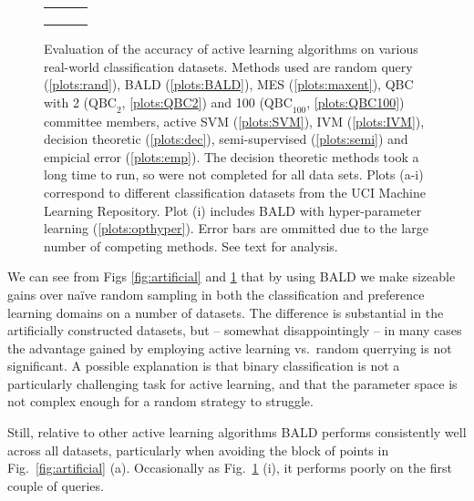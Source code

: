 \begin{figure}
	\begin{center}
	\begin{tabular}{ccc}
	&
	&
	\\
	&
	&
	\\
	&
	&
	
	\end{tabular}
	\end{center}
	\caption[Evaluation of Bayesian active learning on real-world data sets]{Evaluation of the accuracy of active learning algorithms on various real-world classification datasets. Methods used are random query (\ref{plots:rand}), BALD (\ref{plots:BALD}),  MES (\ref{plots:maxent}), QBC with 2 ($\mbox{QBC}_2$, \ref{plots:QBC2}) and 100 ($\mbox{QBC}_{100}$, \ref{plots:QBC100}) committee members, active SVM (\ref{plots:SVM}), IVM (\ref{plots:IVM}), decision theoretic \citep{Kapoor2007} (\ref{plots:dec}), semi-supervised \citep{Zhu2003} (\ref{plots:semi}) and empicial error (\ref{plots:emp}). The decision theoretic methods took a long time to run, so were not completed for all data sets. Plots (a-i) correspond to different classification datasets from the UCI Machine Learning Repository. Plot (i) includes BALD with hyper-parameter learning (\ref{plots:opthyper}).  Error bars are ommitted due to the large number of competing methods. See text for analysis. \label{fig:BALD_GPC_results}}
\end{figure}

\cbstart
We can see from Figs \ref{fig:artificial} and \ref{fig:BALD_GPC_results} that by using BALD we make sizeable gains over na\"{i}ve random sampling in both the classification and preference learning domains on a number of datasets. The difference is substantial in the artificially constructed datasets, but -- somewhat disappointingly -- in many cases the advantage gained by employing active learning vs.\ random querrying is not significant. A possible explanation is that binary classification is not a particularly challenging task for active learning, and that the parameter space is not complex enough for a random strategy to struggle.

Still, relative to other active learning algorithms BALD performs consistently well across all datasets, particularly when avoiding the block of points in Fig.\ \ref{fig:artificial} (a). Occasionally \eg as Fig.\ \ref{fig:BALD_GPC_results} (i), it performs poorly on the first couple of queries.
\cbend

